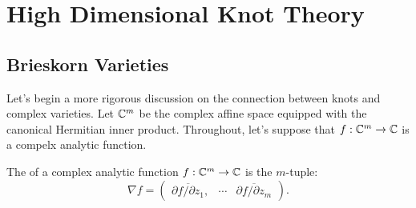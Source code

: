 \chapter{High Dimensional Knot Theory}


\section{Brieskorn Varieties}

Let's begin a more rigorous discussion on the connection between knots and complex varieties. 
Let $\mathbb{C}^m$ be the complex affine space equipped with the canonical Hermitian inner product. Throughout, let's suppose that $f : \mathbb{C}^m \to \mathbb{C}$ is a compelx analytic function.


\begin{definition}
  The  of a complex analytic function $f : \mathbb{C}^m \to \mathbb{C}$ is the $m$-tuple:
  \[
    \nabla f = \begin{pmatrix}\overline{\partial f / \partial z_1}, &\cdots& \overline{\partial f / \partial z_m}\end{pmatrix}.
  \]
\end{definition}
